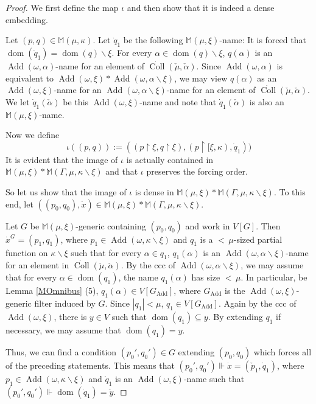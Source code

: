 \documentclass[a4paper]{amsart}
\theoremstyle{definition}
\theoremstyle{remark}
\theoremstyle{plain}
\numberwithin{mydef}{section}
\DeclareMathOperator{\dom}{dom}
\DeclareMathOperator{\Add}{Add}
\DeclareMathOperator{\Coll}{Coll}
\newcommand{\dM}{\mathbb{M}}
\newcommand{\uhr}{\upharpoonright}
\begin{document}
	\begin{proof}
		We first define the map $\iota$ and then show that it is indeed a dense embedding.
		
		Let $(p,q)\in\dM(\mu,\kappa)$. Let $\dot{q}_1$ be the following $\dM(\mu,\xi)$-name: It is forced that $\dom(\dot{q}_1)=\dom(q)\smallsetminus\xi$. For every $\alpha\in\dom(q)\smallsetminus\xi$, $q(\alpha)$ is an $\Add(\omega,\alpha)$-name for an element of $\dot{\Coll}(\check{\mu},\check{\alpha})$. Since $\Add(\omega,\alpha)$ is equivalent to $\Add(\omega,\xi)*\Add(\omega,\alpha\smallsetminus\xi)$, we may view $q(\alpha)$ as an $\Add(\omega,\xi)$-name for an $\Add(\omega,\alpha\smallsetminus\xi)$-name for an element of $\dot{\Coll}(\check{\mu},\check{\alpha})$. We let $\dot{q}_1(\check{\alpha})$ be this $\Add(\omega,\xi)$-name and note that $\dot{q}_1(\check{\alpha})$ is also an $\dM(\mu,\xi)$-name.
		
		Now we define
		$$\iota((p,q)):=((p\uhr\xi,q\uhr\xi),(p\uhr[\xi,\kappa),\dot{q}_1))$$
		It is evident that the image of $\iota$ is actually contained in $\dM(\mu,\xi)*\dM(\Gamma,\mu,\kappa\smallsetminus\xi)$ and that $\iota$ preserves the forcing order.
		
		So let us show that the image of $\iota$ is dense in $\dM(\mu,\xi)*\dM(\Gamma,\mu,\kappa\smallsetminus\xi)$. To this end, let $((p_0,q_0),\dot{x})\in\dM(\mu,\xi)*\dM(\Gamma,\mu,\kappa\smallsetminus\xi)$.
		
		Let $G$ be $\dM(\mu,\xi)$-generic containing $(p_0,q_0)$ and work in $V[G]$. Then $\dot{x}^G=(p_1,q_1)$, where $p_1\in\Add(\omega,\kappa\smallsetminus\xi)$ and $q_1$ is a ${<}\,\mu$-sized partial function on $\kappa\smallsetminus\xi$ such that for every $\alpha\in q_1$, $q_1(\alpha)$ is an $\Add(\omega,\alpha\smallsetminus\xi)$-name for an element in $\dot{\Coll}(\check{\mu},\check{\alpha})$. By the ccc of $\Add(\omega,\alpha\smallsetminus\xi)$, we may assume that for every $\alpha\in\dom(q_1)$, the name $q_1(\alpha)$ has size ${<}\,\mu$. In particular, be Lemma \ref{MOmnibus} (5), $q_1(\alpha)\in V[G_{\Add}]$, where $G_{\Add}$ is the $\Add(\omega,\xi)$-generic filter induced by $G$. Since $|q_1|<\mu$, $q_1\in V[G_{\Add}]$. Again by the ccc of $\Add(\omega,\xi)$, there is $y\in V$ such that $\dom(q_1)\subseteq y$. By extending $q_1$ if necessary, we may assume that $\dom(q_1)=y$.
		
		Thus, we can find a condition $(p_0',q_0')\in G$ extending $(p_0,q_0)$ which forces all of the preceding statements. This means that $(p_0',q_0')\Vdash\dot{x}=(\check{p}_1,\dot{q}_1)$, where $p_1\in\Add(\omega,\kappa\smallsetminus\xi)$ and $\dot{q}_1$ is an $\Add(\omega,\xi)$-name such that $(p_0',q_0')\Vdash\dom(\dot{q}_1)=\check{y}$.
		

\end{proof}
\end{document}
